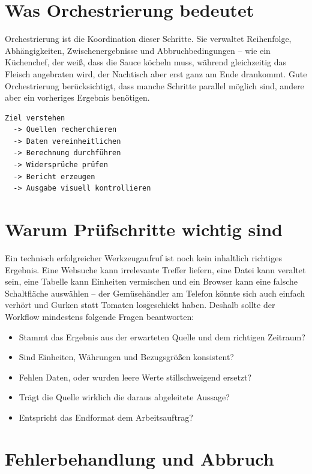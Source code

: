 \section{Was Orchestrierung bedeutet}

Orchestrierung ist die Koordination dieser Schritte. Sie verwaltet Reihenfolge, Abhängigkeiten, Zwischenergebnisse und Abbruchbedingungen -- wie ein Küchenchef, der weiß, dass die Sauce köcheln muss, während gleichzeitig das Fleisch angebraten wird, der Nachtisch aber erst ganz am Ende drankommt. Gute Orchestrierung berücksichtigt, dass manche Schritte parallel möglich sind, andere aber ein vorheriges Ergebnis benötigen.

\begin{lstlisting}
Ziel verstehen
  -> Quellen recherchieren
  -> Daten vereinheitlichen
  -> Berechnung durchführen
  -> Widersprüche prüfen
  -> Bericht erzeugen
  -> Ausgabe visuell kontrollieren
\end{lstlisting}

\section{Warum Prüfschritte wichtig sind}

Ein technisch erfolgreicher Werkzeugaufruf ist noch kein inhaltlich richtiges Ergebnis. Eine Websuche kann irrelevante Treffer liefern, eine Datei kann veraltet sein, eine Tabelle kann Einheiten vermischen und ein Browser kann eine falsche Schaltfläche auswählen -- der Gemüsehändler am Telefon könnte sich auch einfach verhört und Gurken statt Tomaten losgeschickt haben. Deshalb sollte der Workflow mindestens folgende Fragen beantworten:

\begin{itemize}
\item Stammt das Ergebnis aus der erwarteten Quelle und dem richtigen Zeitraum?
\item Sind Einheiten, Währungen und Bezugsgrößen konsistent?
\item Fehlen Daten, oder wurden leere Werte stillschweigend ersetzt?
\item Trägt die Quelle wirklich die daraus abgeleitete Aussage?
\item Entspricht das Endformat dem Arbeitsauftrag?
\end{itemize}

\section{Fehlerbehandlung und Abbruch}

